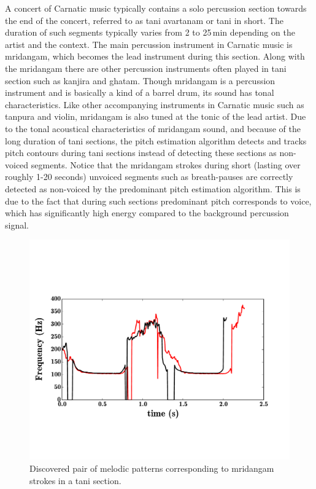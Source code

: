 {A concert of Carnatic music typically contains a solo percussion section towards the end of the concert, referred to as \gls{tani} avartanam or \gls{tani} in short. The duration of such segments typically varies from 2 to 25\,min depending on the artist and the context. The main percussion instrument in Carnatic music is \gls{mridangam}, which becomes the lead instrument during this section. Along with the \gls{mridangam} there are other percussion instruments often played in \gls{tani} section such as \gls{kanjira} and \gls{ghatam}. Though \gls{mridangam} is a percussion instrument and is basically a kind of a barrel drum, its sound has tonal characteristics. Like other accompanying instruments in Carnatic music such as \gls{tanpura} and violin, \Gls{mridangam} is also tuned at the tonic of the lead artist. Due to the tonal acoustical characteristics of \gls{mridangam} sound, and because of the long duration of \gls{tani} sections, the pitch estimation algorithm detects and tracks pitch contours during \gls{tani} sections instead of detecting these sections as non-voiced segments. Notice that the \gls{mridangam} strokes during short (lasting over roughly 1-20 seconds) unvoiced segments such as breath-pauses are correctly detected as non-voiced by the predominant pitch estimation algorithm. This is due to the fact that during such sections predominant pitch corresponds to voice, which has significantly high energy compared to the background percussion signal. 


\begin{figure}
	\begin{center}
		\includegraphics[width=\figSizeNinety]{ch05_preprocessing/figures/taniPatterns.pdf}
	\end{center}
	\caption{Discovered pair of melodic patterns corresponding to \gls{mridangam} strokes in a \gls{tani} section.}
	\label{fig:pitch_pattern_tani}
\end{figure}

}
